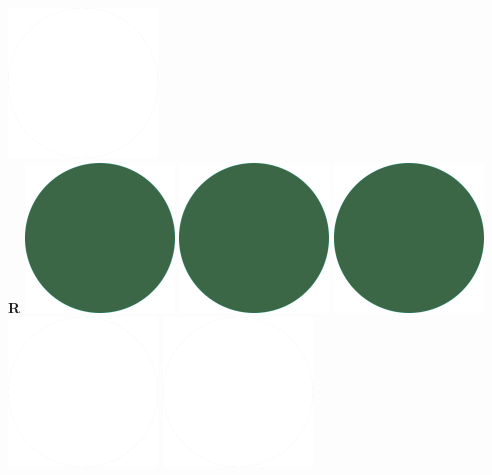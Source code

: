 \documentclass[a4paper]{friggeri-cv_reccius-experiment}
\begin{document}
\begin{aside}
    \includegraphics[scale=0.11]{img/WhiteDots.png}\\
    \belowspace
    \textbf{R}\hfill
    \includegraphics[scale=0.11]{img/IPSGreenDots.png}
    \includegraphics[scale=0.11]{img/IPSGreenDots.png}
    \includegraphics[scale=0.11]{img/IPSGreenDots.png}
    \includegraphics[scale=0.11]{img/WhiteDots.png}
    \includegraphics[scale=0.11]{img/WhiteDots.png}

\end{aside}
\end{document}
